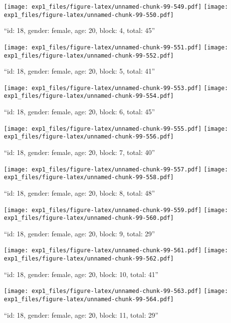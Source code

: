 \documentclass[,]{article}
\begin{document}
\texttt{[image: exp1\_files/figure-latex/unnamed-chunk-99-549.pdf]}
\texttt{[image: exp1\_files/figure-latex/unnamed-chunk-99-550.pdf]}

\newpage
[1] 

``id: 18, gender: female, age: 20, block: 4, total: 45''

\texttt{[image: exp1\_files/figure-latex/unnamed-chunk-99-551.pdf]}
\texttt{[image: exp1\_files/figure-latex/unnamed-chunk-99-552.pdf]}

\newpage
[1] 

``id: 18, gender: female, age: 20, block: 5, total: 41''

\texttt{[image: exp1\_files/figure-latex/unnamed-chunk-99-553.pdf]}
\texttt{[image: exp1\_files/figure-latex/unnamed-chunk-99-554.pdf]}

\newpage
[1] 

``id: 18, gender: female, age: 20, block: 6, total: 45''

\texttt{[image: exp1\_files/figure-latex/unnamed-chunk-99-555.pdf]}
\texttt{[image: exp1\_files/figure-latex/unnamed-chunk-99-556.pdf]}

\newpage
[1] 

``id: 18, gender: female, age: 20, block: 7, total: 40''

\texttt{[image: exp1\_files/figure-latex/unnamed-chunk-99-557.pdf]}
\texttt{[image: exp1\_files/figure-latex/unnamed-chunk-99-558.pdf]}

\newpage
[1] 

``id: 18, gender: female, age: 20, block: 8, total: 48''

\texttt{[image: exp1\_files/figure-latex/unnamed-chunk-99-559.pdf]}
\texttt{[image: exp1\_files/figure-latex/unnamed-chunk-99-560.pdf]}

\newpage
[1] 

``id: 18, gender: female, age: 20, block: 9, total: 29''

\texttt{[image: exp1\_files/figure-latex/unnamed-chunk-99-561.pdf]}
\texttt{[image: exp1\_files/figure-latex/unnamed-chunk-99-562.pdf]}

\newpage
[1] 

``id: 18, gender: female, age: 20, block: 10, total: 41''

\texttt{[image: exp1\_files/figure-latex/unnamed-chunk-99-563.pdf]}
\texttt{[image: exp1\_files/figure-latex/unnamed-chunk-99-564.pdf]}

\newpage
[1] 

``id: 18, gender: female, age: 20, block: 11, total: 29''
\end{document}
